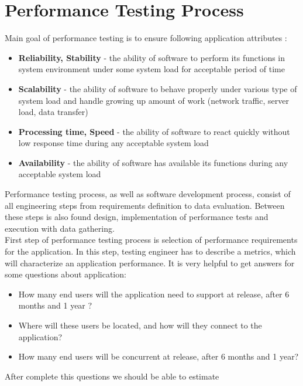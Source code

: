 \section{Performance Testing Process}
\label{Performance Testing Process}
Main goal of performance testing is to ensure following application attributes \cite{GAO:MEASURING}:

\begin{itemize}
	\setlength\itemsep{0em}
	\item \textbf{Reliability, Stability} - the ability of software to perform its functions in system environment under some system load for acceptable period of time
	\item \textbf{Scalability} - the ability of software to behave properly under various type of system load and handle growing up amount of work (network traffic, server load, data transfer)
	\item \textbf{Processing time, Speed} - the ability of software to react quickly without low response time during any acceptable system load
	\item \textbf{Availability} - the ability of software has available its functions during any acceptable system load
\end{itemize}

Performance testing process, as well as software development process, consist of all engineering steps from requirements definition to data evaluation. Between these steps is also found design, implementation of performance tests and execution with data gathering. 
\\

First step of performance testing process is selection of performance requirements for the application. In this step, testing engineer has to describe a metrics, which will characterize an application performance. It is very helpful to get answers for some questions about application:

\begin{itemize}
	\setlength\itemsep{0em}
	\item How many end users will the application need to support at release, after 6 months and 1 year ?
	\item Where will these users be located, and how will they connect to the application?
	\item How many end users will be concurrent at release, after 6 months and 1 year?
\end{itemize}

After complete this questions we should be able to estimate 


